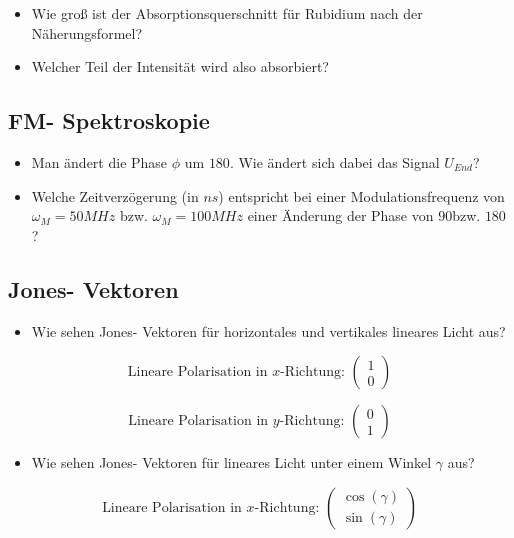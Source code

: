 \documentclass[a4paper,oneside]{article}
\begin{document}
\begin{itemize}
\item Wie groß ist der Absorptionsquerschnitt für Rubidium nach der Näherungsformel?
\end{itemize}

\begin{itemize}
\item Welcher Teil der Intensität wird also absorbiert?
\end{itemize}

\subsection{FM- Spektroskopie}
\begin{itemize}
\item Man ändert die Phase $\phi$ um $180$\textdegree. Wie ändert sich dabei das Signal $U_{End}$?
\end{itemize}

\begin{itemize}
\item Welche Zeitverzögerung (in $ns$) entspricht bei einer Modulationsfrequenz von $\omega_M=50 MHz$ bzw. $\omega_M=100 MHz$ einer Änderung der Phase von $90$\textdegree bzw. $180$\textdegree?
\end{itemize}

\subsection{Jones- Vektoren}
\begin{itemize}
\item Wie sehen Jones- Vektoren für horizontales und vertikales lineares Licht aus?
\end{itemize}
\begin{equation}
 \text{Lineare Polarisation in $x$-Richtung: }
\left(\begin{array}{c}
       1\\
0
      \end{array}
\right)
\end{equation}

\begin{equation}
 \text{Lineare Polarisation in $y$-Richtung: }
\left(\begin{array}{c}
       0\\
1
      \end{array}
\right)
\end{equation}


\begin{itemize}
\item Wie sehen Jones- Vektoren für lineares Licht unter einem Winkel $\gamma$ aus?
\end{itemize}
\begin{equation}
 \text{Lineare Polarisation in $x$-Richtung: }
\left(\begin{array}{c}
       \cos(\gamma)\\
      \sin(\gamma)
      \end{array}
\right)
\end{equation}
\end{document}
